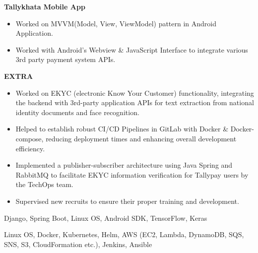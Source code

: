 \documentclass[10pt,a4paper,ragged2e,withhyper]{altacv}
\begin{document}
\textbf{Tallykhata Mobile App}
\begin{itemize}
\item Worked on MVVM(Model, View, ViewModel) pattern in Android Application.
\item Worked with Android's Webview \& JavaScript Interface to integrate various 3rd party payment system APIs.
\end{itemize}
\textbf{EXTRA}
\begin{itemize}
\item Worked on EKYC (electronic Know Your Customer) functionality, integrating the backend with 3rd-party application APIs for text extraction from national identity documents and face recognition.
\item Helped to establish robust CI/CD Pipelines in GitLab with Docker \& Docker-compose, reducing deployment times and enhancing overall development efficiency.
\item Implemented a publisher-subscriber architecture using Java Spring and RabbitMQ to facilitate EKYC information verification for Tallypay users by the TechOps team.
\item Supervised new recruits to ensure their proper training and development.
\end{itemize}






{Django, Spring Boot, Linux OS, Android SDK, TensorFlow, Keras}

 {Linux OS, Docker, Kubernetes, Helm, AWS (EC2, Lambda, DynamoDB, SQS, SNS, S3, CloudFormation etc.), Jenkins, Ansible}
\end{document}
